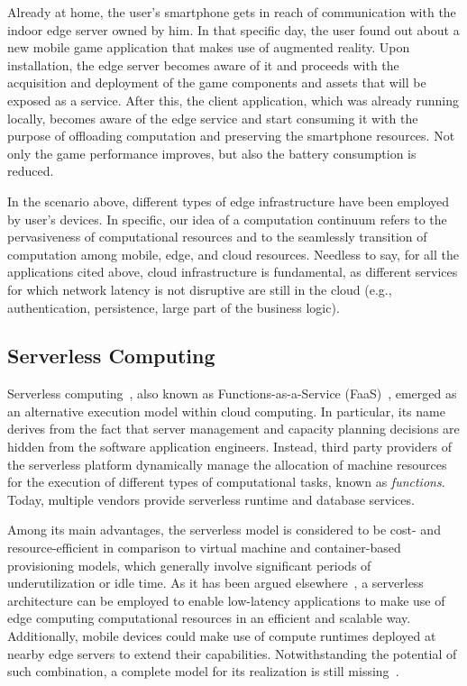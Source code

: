 Already at home, the user's smartphone gets in reach of communication with the indoor edge server owned by him. In that specific day, the user found out about a new mobile game application that makes use of augmented reality. Upon installation, the edge server becomes aware of it and proceeds with the acquisition and deployment of the game components and assets that will be exposed as a service. After this, the client application, which was already running locally, becomes aware of the edge service and start consuming it with the purpose of offloading computation and preserving the smartphone resources. Not only the game performance improves, but also the battery consumption is reduced.  

In the scenario above, different types of edge infrastructure have been employed by user's devices. In specific, our idea of a computation continuum refers to the pervasiveness of computational resources and to the seamlessly transition of computation among mobile, edge, and cloud resources. Needless to say, for all the applications cited above, cloud infrastructure is  fundamental, as different services for which network latency is not disruptive are still in the cloud (e.g., authentication, persistence, large part of the business logic).

\subsection{Serverless Computing}

Serverless computing~\cite{roberts2016serverless, hendrickson2016serverless}, also known as Functions-as-a-Service (FaaS)~\cite{mateosFaas17}, emerged as an alternative execution model within cloud computing. In particular, its name derives from the fact that server management and capacity planning decisions are hidden from the software application engineers. Instead, third party providers of the serverless platform dynamically manage the allocation of machine resources for the execution of different types of computational tasks, known as \textit{functions}. Today, multiple vendors provide serverless runtime and database services. 

Among its main advantages, the serverless model is considered to be cost- and resource-efficient in comparison to virtual machine and container-based provisioning models, which generally involve significant periods of underutilization or idle time. As it has been argued elsewhere~\cite{ESOCC'17}, a serverless architecture can be employed to enable low-latency applications to make use of edge computing computational resources in an efficient and scalable way. Additionally, mobile devices could make use of compute runtimes deployed at nearby edge servers to extend their capabilities. Notwithstanding the potential of such combination, a complete model for its realization is still missing~\cite{NasticServerlessEdge17}. 

